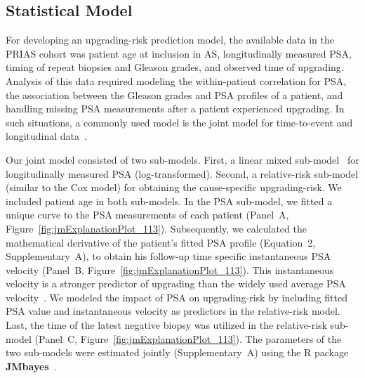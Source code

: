 \subsection{Statistical Model}
For developing an upgrading-risk prediction model, the available data in the PRIAS cohort was patient age at inclusion in AS, longitudinally measured PSA, timing of repeat biopsies and Gleason grades, and observed time of upgrading. Analysis of this data required modeling the within-patient correlation for PSA, the association between the Gleason grades and PSA profiles of a patient, and handling missing PSA measurements after a patient experienced upgrading. In such situations, a commonly used model is the joint model for time-to-event and longitudinal data~\citep{tomer2019,coley2017prediction,rizopoulos2012joint}.

Our joint model consisted of two sub-models. First, a linear mixed sub-model~\citep{laird1982random} for longitudinally measured PSA (log-transformed). Second, a relative-risk sub-model (similar to the Cox model) for obtaining the cause-specific upgrading-risk. We included patient age in both sub-models. In the PSA sub-model, we fitted a unique curve to the PSA measurements of each patient (Panel~A, Figure~\ref{fig:jmExplanationPlot_113}). Subsequently, we calculated the mathematical derivative of the patient's fitted PSA profile (Equation~2, Supplementary~A), to obtain his follow-up time specific instantaneous PSA velocity (Panel~B, Figure~\ref{fig:jmExplanationPlot_113}). This instantaneous velocity is a stronger predictor of upgrading than the widely used average PSA velocity~\citep{cooperberg2018refined}. We modeled the impact of PSA on upgrading-risk by including fitted PSA value and instantaneous velocity as predictors in the relative-risk model. Last, the time of the latest negative biopsy was utilized in the relative-risk sub-model (Panel~C, Figure~\ref{fig:jmExplanationPlot_113}). The parameters of the two sub-models were estimated jointly (Supplementary~A) using the R package \textbf{JMbayes}~\citep{rizopoulosJMbayes}. 

